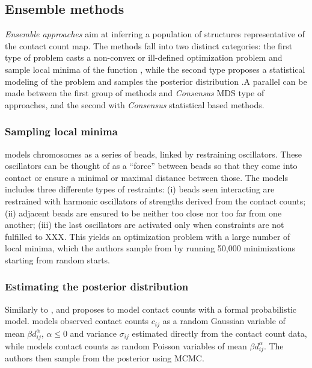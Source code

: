 \documentclass[letterpaper,12pt]{article}
\begin{document}
\subsection*{Ensemble methods}

{\em Ensemble approaches} aim at inferring a population of structures
representative of the contact count map. The methods fall into two distinct
categories: the first type of problem casts a non-convex or ill-defined
optimization problem and sample local minima of the function
\citep{bau:three-dimensional, umbarger:three-dimensional}, while the second
type proposes a statistical modeling of the problem and samples the posterior
distribution \citep{rousseau:three, hu:bayesian}.A parallel can be made
between the first group of methods and {\em Consensus} MDS type of approaches,
and the second with {\em Consensus} statistical based methods.

\subsubsection*{Sampling local minima}

\citet{umbarger:three-dimensional,bau:three-dimensional, kalhor:genome} models
chromosomes as a series of beads, linked by restraining oscillators. These
oscillators can be thought of as a ``force'' between beads so that they come
into contact or ensure a minimal or maximal distance between those. The models
includes three differente types of restraints: (i) beads seen interacting are
restrained with harmonic oscillators of strengths derived from the contact
counts; (ii) adjacent beads are ensured to be neither too close nor too far
from one another; (iii) the last oscillators are activated only when
constraints are not fulfilled to XXX.  This yields an optimization problem
with a large number of local minima, which the authors sample from by running
50,000 minimizations starting from random starts.

\subsubsection*{Estimating the posterior distribution}

Similarly to \citet{varoquaux:statistical}, \citet{rousseau:three} and
\citet{hu:bayesian} proposes to model contact counts with a formal
probabilistic model. \citet{rousseau:three} models observed contact counts
$c_{ij}$ as a random Gaussian variable of mean $\beta d_{ij}^{\alpha}$,
$\alpha \leq 0$ and variance $\sigma_{ij}$ estimated directly from the contact
count data, while \citet{hu:bayesian} models contact counts as random Poisson
variables of mean $\beta d_{ij}^\alpha$. The authors then sample from the
posterior using MCMC.
\end{document}
